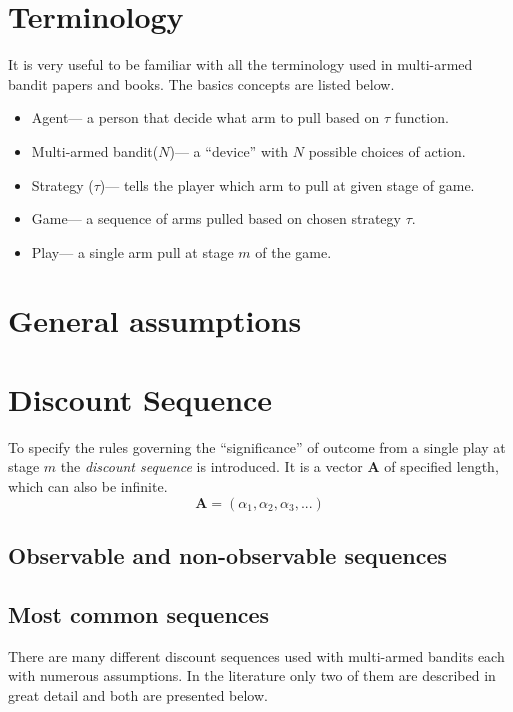 \documentclass[12pt, a4paper, pdflatex]{report}
\begin{document}
\section{Terminology}
It is very useful to be familiar with all the terminology used in multi-armed bandit papers and books. The basics concepts are listed below.
\begin{itemize}
\item Agent--- a person that decide what arm to pull based on $\tau$ function.\\
\item Multi-armed bandit($N$)--- a ``device'' with $N$ possible choices of action.~\cite{berry+firstedt}\\
\item Strategy ($\tau$)--- tells the player which arm to pull at given stage of game.\\
\item Game--- a sequence of arms pulled based on chosen strategy $\tau$.\\
\item Play--- a single arm pull at stage $m$ of the game.
\end{itemize}

\section{General assumptions}
\lipsum[1]

\section{Discount Sequence}
To specify the rules governing the ``significance'' of outcome from a single play at stage $m$ the \emph{discount sequence} is introduced. It is a vector $\mathbf{A}$ of specified length, which can also be infinite.
$$
\mathbf{A} = \left( \alpha_1, \alpha_2, \alpha_3, ... \right)
$$

\subsection{Observable and non-observable sequences}
\lipsum[1]

\subsection{Most common sequences}
There are many different discount sequences used with multi-armed bandits each with numerous assumptions. In the literature only two of them are described in great detail and both are presented below.
\end{document}
